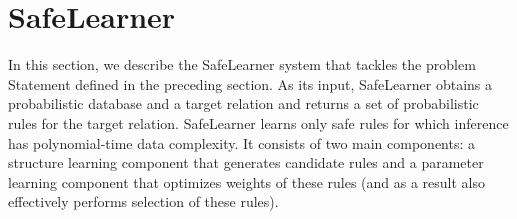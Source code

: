 \documentclass[akbc,twoside,11pt]{article}
\newcounter{example}
\newcommand{\algorithmname}{SafeLearner\xspace}
\begin{document}

\section{\algorithmname}
\label{sec:algo}
In this section, we describe the \algorithmname system that tackles the problem Statement defined in the preceding section. As its input, \algorithmname obtains a probabilistic database and a target relation and returns a set of probabilistic rules for the target relation. \algorithmname learns only safe rules for which inference has polynomial-time data complexity. It consists of two main components: a structure learning component that generates candidate rules and a parameter learning component that optimizes weights of these rules (and as a result also effectively performs selection of these rules). 
\end{document}
